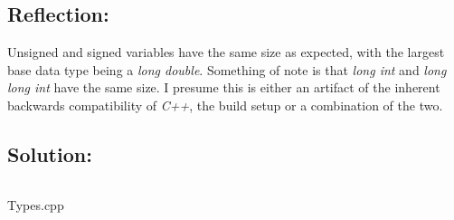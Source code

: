 \documentclass[main.tex]{subfiles}
\begin{document}
        \subsection{Reflection:}
            Unsigned and signed variables have the same size as expected, with
            the largest base data type being a \textit{long double}.
            Something of note is that \textit{long int} and \textit{long long int} have the same size.
            I presume this is either an artifact of the inherent backwards compatibility of \textit{C++},
            the build setup or a combination of the two.

        \subsection{Solution:}
            \begin{listing}[!ht]
                \inputminted[firstline=6]{cpp}{../Tasks/03-Types/Types.cpp}
                \caption{Types.cpp}
            \end{listing}
\end{document}
